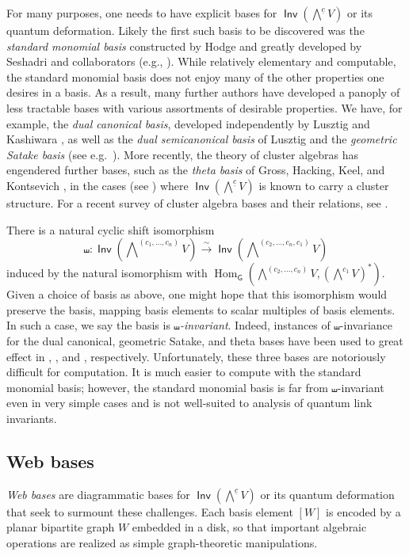 \documentclass{amsart}
\theoremstyle{definition}
\theoremstyle{remark}
\numberwithin{equation}{section}
\DeclareMathOperator{\Inv}{\mathsf{Inv}}
\DeclareMathOperator{\Hom}{\mathrm{Hom}}
\begin{document}
For many purposes, one needs to have explicit bases for $\Inv(\bigwedge\nolimits^{\underline{c}} V)$ or its quantum deformation. Likely the first such basis to be discovered was the \emph{standard monomial basis} constructed by Hodge \cite{Hodge} and greatly developed by Seshadri and collaborators (e.g., \cite{Seshadri:1,Seshadri:2,Seshadri:3,Seshadri:4}). While relatively elementary and computable, the standard monomial basis does not enjoy many of the other properties one desires in a basis. As a result, many further authors have developed a panoply of less tractable bases with various assortments of desirable properties. We have, for example, the \emph{dual canonical basis}, developed independently by Lusztig \cite{Lusztig:canonical} and Kashiwara \cite{Kashiwara:duke_crystals}, as well as the \emph{dual semicanonical basis} of Lusztig \cite{Lusztig:semicanonical_1, Lusztig:semicanonical_2} and the \emph{geometric Satake basis} (see e.g.\ \cite{Zhu}). More recently, the theory of cluster algebras has engendered further bases, such as the \emph{theta basis} of Gross, Hacking, Keel, and Kontsevich \cite{Gross.Hacking.Keel.Kontsevich}, in the cases (see \cite{Fomin-Pylyavskyy-advances}) where $\Inv(\bigwedge\nolimits^{\underline{c}} V)$ is known to carry a cluster structure. For a recent survey of cluster algebra bases and their relations, see \cite{Qin:survey}.

There is a natural cyclic shift isomorphism 
\[
 \shuffle : \Inv\left(\bigwedge\nolimits^{(c_1, \dots, c_n)} V\right) \xrightarrow{\sim} \Inv\left(\bigwedge\nolimits^{(c_2, \ldots, c_n, c_1)} V\right)
\] 
induced by the natural isomorphism with $\Hom_\mathsf{G}(\bigwedge\nolimits^{(c_2, \dots, c_n)} V, (\bigwedge\nolimits^{c_1} V)^*)$.
Given a choice of basis as above, one might hope that this isomorphism would preserve the basis, mapping basis elements to scalar multiples of basis elements. In such a case, we say the basis is \emph{$\shuffle$-invariant}. Indeed, instances of $\shuffle$-invariance for the dual canonical, geometric Satake, and theta bases have been used to great effect in \cite{Rhoades}, \cite{Fontaine.Kamnitzer}, and \cite{Shen.Weng}, respectively. Unfortunately, these three bases are notoriously difficult for computation. It is much easier to compute with the standard monomial basis; however, the standard monomial basis is far from $\shuffle$-invariant even in very simple cases and is not well-suited to analysis of quantum link invariants.

\subsection{Web bases}
\emph{Web bases} are diagrammatic bases for $\Inv(\bigwedge\nolimits^{\underline{c}} V)$ or its quantum deformation that seek to surmount these challenges. Each basis element $[W]$ is encoded by a planar bipartite graph $W$ embedded in a disk, so that important algebraic operations are realized as simple graph-theoretic manipulations.
\end{document}
